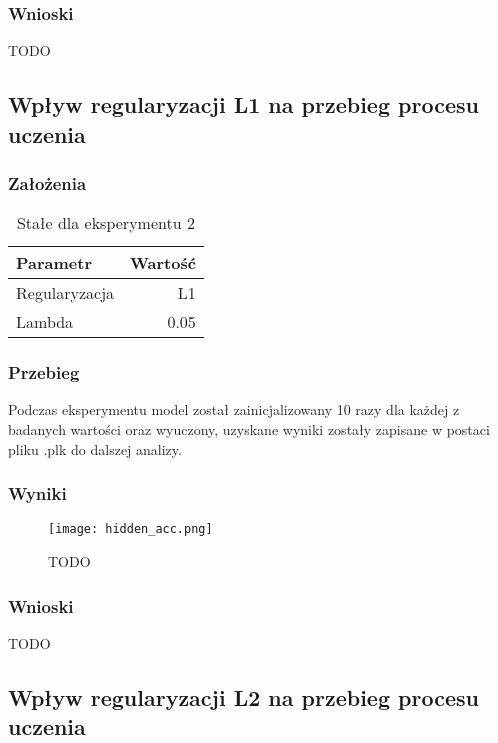 \documentclass{article}
\begin{document}
\subsubsection*{Wnioski}

TODO
\newpage
\subsection{Wpływ regularyzacji L1 na przebieg procesu uczenia}
\subsubsection*{Założenia}
\begin{table}[H]
	\caption{Stałe dla eksperymentu 2}
	\label{tabela-const-2}
	\centering
	\begin{tabular}{lr}
		\toprule
		Parametr      & Wartość \\
		\midrule
		Regularyzacja & L1        \\
		Lambda        & 0.05      \\
		\bottomrule
	\end{tabular}
\end{table}

\subsubsection*{Przebieg}

Podczas eksperymentu model został zainicjalizowany 10 razy dla każdej z badanych wartości oraz wyuczony, uzyskane wyniki zostały zapisane w postaci pliku .plk do dalszej analizy.

\subsubsection*{Wyniki}
\begin{figure}[H]
	\centering
	\caption{TODO}
	\texttt{[image: hidden\_acc.png]}
	\label{fig:res21}
\end{figure}

\subsubsection*{Wnioski}

TODO

\newpage
\subsection{Wpływ regularyzacji L2 na przebieg procesu uczenia}
\end{document}
